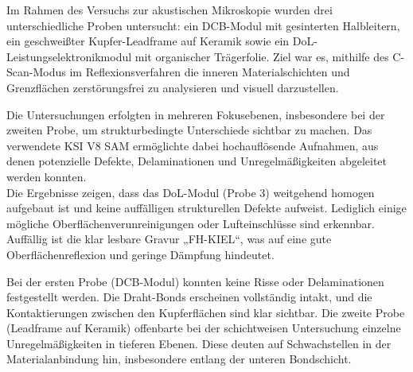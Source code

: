 
Im Rahmen des Versuchs zur akustischen Mikroskopie wurden drei unterschiedliche Proben untersucht: ein DCB-Modul mit gesinterten Halbleitern, ein geschweißter Kupfer-Leadframe auf Keramik sowie ein DoL-Leistungselektronikmodul mit organischer Trägerfolie. Ziel war es, mithilfe des C-Scan-Modus im Reflexionsverfahren die inneren Materialschichten und Grenzflächen zerstörungsfrei zu analysieren und visuell darzustellen.

Die Untersuchungen erfolgten in mehreren Fokusebenen, insbesondere bei der zweiten Probe, um strukturbedingte Unterschiede sichtbar zu machen. Das verwendete KSI V8 SAM ermöglichte dabei hochauflösende Aufnahmen, aus denen potenzielle Defekte, Delaminationen und Unregelmäßigkeiten abgeleitet werden konnten.\\
Die Ergebnisse zeigen, dass das DoL-Modul (Probe 3) weitgehend homogen aufgebaut ist und keine auffälligen strukturellen Defekte aufweist. Lediglich einige mögliche Oberflächenverunreinigungen oder Lufteinschlüsse sind erkennbar. Auffällig ist die klar lesbare Gravur „FH-KIEL“, was auf eine gute Oberflächenreflexion und geringe Dämpfung hindeutet.

Bei der ersten Probe (DCB-Modul) konnten keine Risse oder Delaminationen festgestellt werden. Die Draht-Bonds erscheinen vollständig intakt, und die Kontaktierungen zwischen den Kupferflächen sind klar sichtbar. Die zweite Probe (Leadframe auf Keramik) offenbarte bei der schichtweisen Untersuchung einzelne Unregelmäßigkeiten in tieferen Ebenen. Diese deuten auf Schwachstellen in der Materialanbindung hin, insbesondere entlang der unteren Bondschicht.